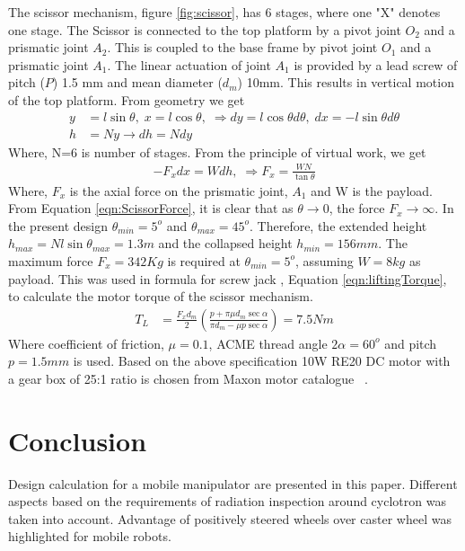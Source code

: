 The scissor mechanism, figure \ref{fig:scissor}, has 6 stages, where one "X" denotes one stage. The Scissor is connected to the top platform by a pivot joint $O_2$ and a prismatic joint $ A_2$. This is coupled to the base frame by pivot joint $O_1$ and a prismatic joint $A_1$. The linear actuation of joint $A_1$ is provided by a lead screw of pitch ($P$) 1.5 mm and mean diameter ($d_m$) 10mm. This results in vertical motion of the top platform. From geometry we get 
\begin{equation}
\begin{aligned}
y&=l\sin\theta,\; x=l\cos\theta,\; \Rightarrow dy=l\cos\theta d\theta, \; dx=-l\sin\theta d\theta\\
h&=Ny\rightarrow dh=Ndy
\end{aligned}
\end{equation} 
Where, N=6 is number of stages. From the principle of virtual work, we get 
\begin{equation}
\label{eqn:ScissorForce}
\begin{aligned}
-F_xdx=Wdh,\;\Rightarrow F_x=\frac{WN}{\tan\theta}
\end{aligned}
\end{equation}
Where, $F_x$ is the axial force on the prismatic joint, $A_1$ and W is the payload. From Equation \ref{eqn:ScissorForce}, it is clear that as $\theta\rightarrow 0$, the force  $F_x \rightarrow \infty$. In the present design  $\theta_{min}=5^o$ and $\theta_{max}=45^o$. Therefore, the extended height  $h_{max}=Nl\sin\theta_{max}=1.3m$ and the collapsed height $h_{min}=156mm$. The maximum force $F_x=342Kg$ is required at $\theta_{min}=5^o$, assuming $W=8kg$ as payload. This was used in formula for screw jack \cite{TOMBook} , Equation \ref{eqn:liftingTorque}, to calculate the motor torque of the scissor mechanism.
\begin{equation}
\label{eqn:liftingTorque}
\begin{aligned}
T_L&=\frac{F_xd_m}{2}(\frac{p+\pi\mu d_m\sec\alpha}{\pi d_m-\mu p\sec \alpha})=7.5Nm
\end{aligned}
\end{equation}
Where coefficient of friction, $\mu=0.1$, ACME thread angle $2\alpha=60^o$ and pitch $p=1.5mm$ is used. Based on the above specification 10W RE20 DC motor with a gear box of 25:1 ratio is chosen from Maxon motor catalogue ~\cite{catMaxon}.



  
  

\section{Conclusion}
Design calculation for a mobile manipulator are presented in this paper. Different aspects based on the requirements of radiation inspection around cyclotron was taken into account. Advantage of positively steered wheels over caster wheel was highlighted for mobile robots. 

